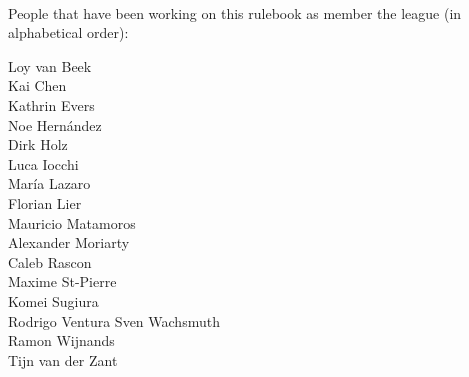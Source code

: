 ~\\\noindent People that have been working on this rulebook as member the league (in alphabetical order):
\begin{multicols}{2}%
\noindent%
Loy van Beek\\
Kai Chen\\
Kathrin Evers\\
Noe Hern{\'a}ndez\\
Dirk Holz\\
Luca Iocchi\\
Mar{\'i}a Lazaro\\
Florian Lier\\
Mauricio Matamoros\\
Alexander Moriarty\\
Caleb Rascon\\
Maxime St-Pierre\\
Komei Sugiura\\
Rodrigo Ventura
Sven Wachsmuth\\
Ramon Wijnands\\
Tijn van der Zant\\
\end{multicols}



